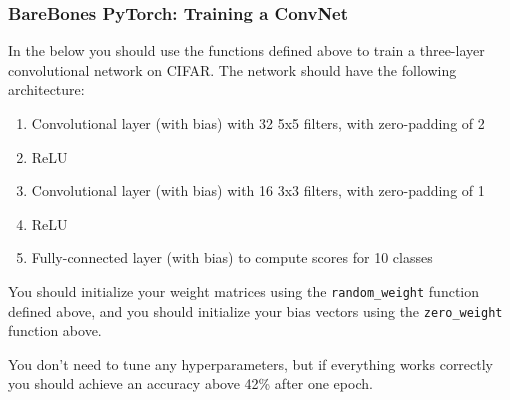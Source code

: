 \documentclass[11pt]{article}
\providecommand{\tightlist}{%
      \setlength{\itemsep}{0pt}\setlength{\parskip}{0pt}}
\begin{document}
    \hypertarget{barebones-pytorch-training-a-convnet}{%
\subsubsection{BareBones PyTorch: Training a
ConvNet}\label{barebones-pytorch-training-a-convnet}}

In the below you should use the functions defined above to train a
three-layer convolutional network on CIFAR. The network should have the
following architecture:

\begin{enumerate}
\def\labelenumi{\arabic{enumi}.}
\tightlist
\item
  Convolutional layer (with bias) with 32 5x5 filters, with zero-padding
  of 2
\item
  ReLU
\item
  Convolutional layer (with bias) with 16 3x3 filters, with zero-padding
  of 1
\item
  ReLU
\item
  Fully-connected layer (with bias) to compute scores for 10 classes
\end{enumerate}

You should initialize your weight matrices using the
\texttt{random\_weight} function defined above, and you should
initialize your bias vectors using the \texttt{zero\_weight} function
above.

You don't need to tune any hyperparameters, but if everything works
correctly you should achieve an accuracy above 42\% after one epoch.
\end{document}
